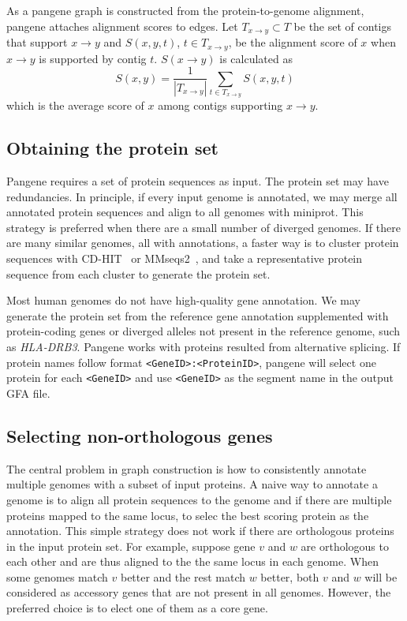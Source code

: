 \documentclass[webpdf,contemporary,large,namedate]{oup-authoring-template}%
\begin{document}
As a pangene graph is constructed from the protein-to-genome alignment,
pangene attaches alignment scores to edges.
Let $T_{x\to y}\subset T$ be the set of contigs that support $x\to y$
and $S(x, y,t)$, $t\in T_{x\to y}$, be the alignment score of $x$ when $x\to y$ is supported by contig $t$.
$S(x\to y)$ is calculated as
$$
S(x, y)=\frac{1}{|T_{x\to y}|}\sum_{t\in T_{x\to y}}S(x, y,t)
$$
which is the average score of $x$ among contigs supporting $x\to y$.

\subsection{Obtaining the protein set}

Pangene requires a set of protein sequences as input.
The protein set may have redundancies.
In principle, if every input genome is annotated, we may merge all annotated protein sequences
and align to all genomes with miniprot.
This strategy is preferred when there are a small number of diverged genomes.
If there are many similar genomes, all with annotations,
a faster way is to cluster protein sequences with CD-HIT~\citep{Li:2006aa} or MMseqs2~\citep{Schneider:2017aa},
and take a representative protein sequence from each cluster to generate the protein set.

Most human genomes do not have high-quality gene annotation.
We may generate the protein set from the reference gene annotation supplemented
with protein-coding genes or diverged alleles not present in the reference genome, such as \emph{HLA-DRB3}.
Pangene works with proteins resulted from alternative splicing.
If protein names follow format {\tt <GeneID>:<ProteinID>},
pangene will select one protein for each {\tt <GeneID>} and use {\tt <GeneID>} as the segment name in the output GFA file.

\subsection{Selecting non-orthologous genes}

The central problem in graph construction is how to consistently annotate multiple genomes with a subset of input proteins.
A naive way to annotate a genome is to align all protein sequences to the genome
and if there are multiple proteins mapped to the same locus, to selec the best scoring protein as the annotation.
This simple strategy does not work if there are orthologous proteins in the input protein set.
For example, suppose gene $v$ and $w$ are orthologous to each other and are thus aligned to the the same locus in each genome.
When some genomes match $v$ better and the rest match $w$ better,
both $v$ and $w$ will be considered as accessory genes that are not present in all genomes.
However, the preferred choice is to elect one of them as a core gene.
\end{document}
